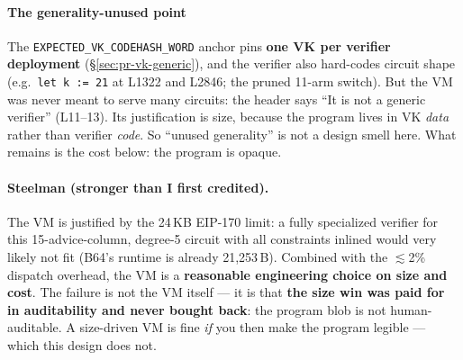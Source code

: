\paragraph{The generality-unused point} 
The \texttt{EXPECTED\_\allowbreak{}VK\_\allowbreak{}CODEHASH\_\allowbreak{}WORD} anchor pins
\textbf{one VK per verifier deployment} (\S\ref{sec:pr-vk-generic}),
and the verifier also hard-codes circuit shape (e.g.\
\texttt{let k := 21} at L1322 and L2846; the pruned 11-arm switch).
But the VM was never meant to serve many circuits: the header
says ``It is not a generic verifier'' (L11--13). Its justification
is size, because the program lives in VK \emph{data} rather than
verifier \emph{code}. So ``unused generality'' is not a design
smell here. What remains is the cost below: the program is opaque.

\paragraph{Steelman (stronger than I first credited).}
The VM is justified by the 24\,KB EIP-170 limit: a fully
specialized verifier for this 15-advice-column, degree-5 circuit
with all constraints inlined would very likely not fit (B64's
runtime is already 21{,}253\,B). Combined with the
$\lesssim$2\% dispatch overhead, the VM is a
\textbf{reasonable engineering choice on size and cost}. The
failure is not the VM itself --- it is that \textbf{the size win
was paid for in auditability and never bought back}: the program
blob is not human-auditable. A size-driven VM is fine \emph{if} you
then make the program legible --- which this design does not.


